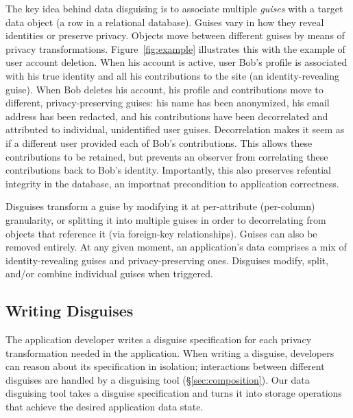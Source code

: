 %
The key idea behind data disguising is to associate multiple \emph{guises} with a target data
object (\ie a row in a relational database).
%
Guises vary in how they reveal identities or preserve privacy.
%
Objects move between different guises by means of privacy transformations.
%
Figure~\ref{fig:example} illustrates this with the example of user account deletion.
%
When his account is active, user Bob's profile is associated with his true identity and all his
contributions to the site (an identity-revealing guise).
%
When Bob deletes his account, his profile and contributions move to different, privacy-preserving
guises: his name has been anonymized, his email address has been redacted, and his contributions
have been decorrelated and attributed to individual, unidentified user guises.
%
Decorrelation makes it seem as if a different user provided each of Bob's contributions.
%
This allows these contributions to be retained, but prevents an observer from correlating these
contributions back to Bob's identity.
%
Importantly, this also preserves refential integrity in the database, an importnat precondition
to application correctness.
%

%
Disguises transform a guise by modifying it at per-attribute (\ie per-column) granularity, or
splitting it into multiple guises in order to decorrelating from objects that reference it (via \eg foreign-key relationships).
%
Guises can also be removed entirely.
%
At any given moment, an application's data comprises a mix of identity-revealing guises
and privacy-preserving ones. Disguises modify, split, and/or combine individual guises when triggered.


\subsection{Writing Disguises}
\label{sec:disguises}
The application developer writes a disguise specification for each privacy transformation needed
in the application.
%
When writing a disguise, developers can reason about its
specification in isolation; interactions between different disguises are handled by a disguising
tool (\S\ref{sec:composition}).
%
%
Our data disguising tool takes a disguise specification and turns it into storage operations that
achieve the desired application data state.

